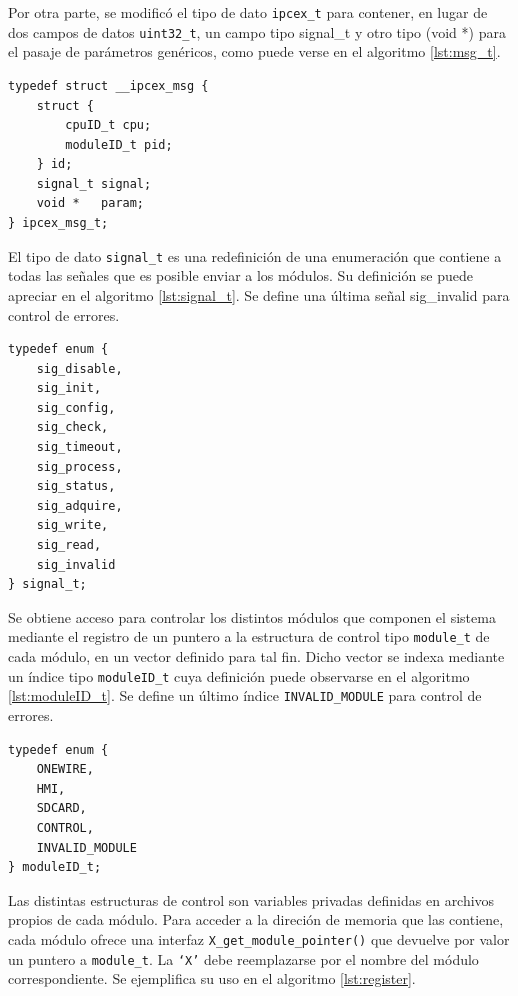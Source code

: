 Por otra parte, se modificó el tipo de dato \texttt{ipcex\_t} para contener, en lugar de dos campos de datos \texttt{uint32\_t}, un campo tipo signal\_t y otro tipo (void *) para el pasaje de parámetros genéricos, como puede verse en el algoritmo \ref{lst:msg_t}.

\vspace{10px}
\begin{lstlisting}[caption={Definición nuevo tipo de dato ipcex\_msg\_t para intercambio de mensajes.},label={lst:msg_t}]
	typedef struct __ipcex_msg {
	struct {
		cpuID_t cpu;
		moduleID_t pid;
	} id;
	signal_t signal;
	void *   param;
} ipcex_msg_t;
\end{lstlisting}

El tipo de dato \texttt{signal\_t} es una redefinición de una enumeración que contiene a todas las señales que es posible enviar a los módulos.  Su definición se puede apreciar en el algoritmo \ref{lst:signal_t}. Se define una última señal sig\_invalid para control de errores.

\begin{lstlisting}[caption={Definición nuevo tipo de dato signal\_t para el envío de señales a los módulos.},label={lst:signal_t}]
typedef enum {
	sig_disable,
	sig_init,
	sig_config,
	sig_check,
	sig_timeout,
	sig_process,
	sig_status,
	sig_adquire,
	sig_write,
	sig_read,
	sig_invalid
} signal_t;
\end{lstlisting}

Se obtiene acceso para controlar los distintos módulos que componen el sistema mediante el registro de un puntero a la estructura de control tipo \texttt{module\_t} de cada módulo, en un vector definido para tal fin.  Dicho vector se indexa mediante un índice tipo \texttt{moduleID\_t} cuya definición puede observarse en el algoritmo \ref{lst:moduleID_t}.  Se define un último índice \texttt{INVALID\_MODULE} para control de errores.

\begin{lstlisting}[caption={Definición nuevo tipo de dato moduleID\_t para indexar el control de los módulos.},label={lst:moduleID_t}]
typedef enum {
	ONEWIRE,
	HMI,
	SDCARD,
	CONTROL,
	INVALID_MODULE
} moduleID_t;
\end{lstlisting}

Las distintas estructuras de control son variables privadas definidas en archivos propios de cada módulo.  Para acceder a la direción de memoria que las contiene, cada módulo ofrece una interfaz \texttt{X\_get\_module\_pointer()} que devuelve por valor un puntero a \texttt{module\_t}. La \texttt{`X'} debe reemplazarse por el nombre del módulo correspondiente.  Se ejemplifica su uso en el algoritmo \ref{lst:register}.

